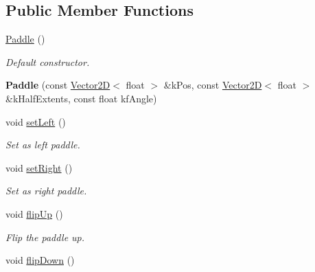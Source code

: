 \subsection*{Public Member Functions}
\begin{DoxyCompactItemize}
\item 
\hypertarget{class_paddle_a53895671ddfde9ba668546065ec4f164}{\hyperlink{class_paddle_a53895671ddfde9ba668546065ec4f164}{Paddle} ()}\label{class_paddle_a53895671ddfde9ba668546065ec4f164}

\begin{DoxyCompactList}\small\item\em Default constructor. \end{DoxyCompactList}\item 
\hypertarget{class_paddle_aa37bdcd24ceb267b5b2b7055c1002bb5}{{\bfseries Paddle} (const \hyperlink{class_vector2_d}{Vector2\+D}$<$ float $>$ \&k\+Pos, const \hyperlink{class_vector2_d}{Vector2\+D}$<$ float $>$ \&k\+Half\+Extents, const float kf\+Angle)}\label{class_paddle_aa37bdcd24ceb267b5b2b7055c1002bb5}

\item 
\hypertarget{class_paddle_a926ced17de3d812eddd5d6aa48118aba}{void \hyperlink{class_paddle_a926ced17de3d812eddd5d6aa48118aba}{set\+Left} ()}\label{class_paddle_a926ced17de3d812eddd5d6aa48118aba}

\begin{DoxyCompactList}\small\item\em Set as left paddle. \end{DoxyCompactList}\item 
\hypertarget{class_paddle_a21f17284347b540a210f669e46fb7033}{void \hyperlink{class_paddle_a21f17284347b540a210f669e46fb7033}{set\+Right} ()}\label{class_paddle_a21f17284347b540a210f669e46fb7033}

\begin{DoxyCompactList}\small\item\em Set as right paddle. \end{DoxyCompactList}\item 
\hypertarget{class_paddle_a9446a94c141d687ea3224fdba2dc7fa0}{void \hyperlink{class_paddle_a9446a94c141d687ea3224fdba2dc7fa0}{flip\+Up} ()}\label{class_paddle_a9446a94c141d687ea3224fdba2dc7fa0}

\begin{DoxyCompactList}\small\item\em Flip the paddle up. \end{DoxyCompactList}\item 
\hypertarget{class_paddle_a3bf356d44b28157c013240d3dde6f9d5}{void \hyperlink{class_paddle_a3bf356d44b28157c013240d3dde6f9d5}{flip\+Down} ()}\label{class_paddle_a3bf356d44b28157c013240d3dde6f9d5}


\end{DoxyCompactItemize}
